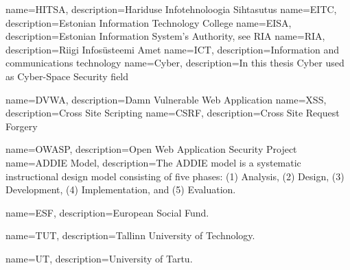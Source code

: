 {
  name=HITSA,
  description={Hariduse Infotehnoloogia Sihtasutus}
}
{
  name=EITC,
  description={Estonian Information Technology College}
}
{
  name=EISA,
  description={Estonian Information System’s Authority, see \gls{RIA}}
}
{
  name=RIA,
  description={Riigi Infosüsteemi Amet}
}
{
  name=ICT,
  description={Information and communications technology}
}
{
  name=Cyber,
  description={In this thesis Cyber used as Cyber-Space Security field}
}
 
{
  name=DVWA,
  description={Damn Vulnerable Web Application}
}
{
  name=XSS,
  description={Cross Site Scripting}
}
{
  name=CSRF,
  description={Cross Site Request Forgery}
}
 
{
  name=OWASP,
  description={Open Web Application Security Project}
}
{
  name=ADDIE Model,
  description={The ADDIE model is a systematic instructional design model consisting of five phases: (1) Analysis, (2) Design, (3) Development, (4) Implementation, and (5) Evaluation.}
} 


{
  name=ESF,
  description={European Social Fund.}
} 


{
  name=TUT,
  description={Tallinn University of Technology.}
} 


{
  name=UT,
  description={University of Tartu.}
} 
